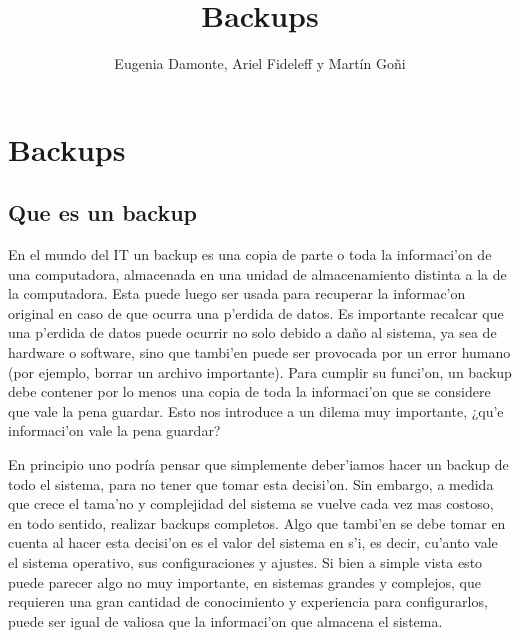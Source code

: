 \documentclass[11pt]{article}
\title{\Huge Backups}
\author{Eugenia Damonte, Ariel Fideleff y Mart\'in Go\~ni}
\date{}
\begin{document}
	\maketitle
	\newpage
	\tableofcontents
	\newpage

	
	\section{Backups}
	\subsection{Que es un backup}
		En el mundo del IT un backup es una copia de parte o toda la informaci'on de una computadora, almacenada en una unidad de almacenamiento distinta a la de la computadora. Esta puede luego ser usada para recuperar la informac'on original en caso de que ocurra una p'erdida de datos. Es importante recalcar que una p'erdida de datos puede ocurrir no solo debido a daño al sistema, ya sea de hardware o software, sino que tambi'en puede ser provocada por un error humano (por ejemplo, borrar un archivo importante). Para cumplir su funci'on, un backup debe contener por lo menos una copia de toda la informaci'on que se considere que vale la pena guardar. Esto nos introduce a un dilema muy importante, ¿qu'e informaci'on vale la pena guardar?

		En principio uno podría pensar que simplemente deber'iamos hacer un backup de todo el sistema, para no tener que tomar esta decisi'on. Sin embargo, a medida que crece el tama'no y complejidad del sistema se vuelve cada vez mas costoso, en todo sentido, realizar backups completos. Algo que tambi'en se debe tomar en cuenta al hacer esta decisi'on es el valor del sistema en s'i, es decir, cu'anto vale el sistema operativo, sus configuraciones y ajustes. Si bien a simple vista esto puede parecer algo no muy importante, en sistemas grandes y complejos, que requieren una gran cantidad de conocimiento y experiencia para configurarlos, puede ser igual de valiosa que la informaci'on que almacena el sistema.
\end{document}

